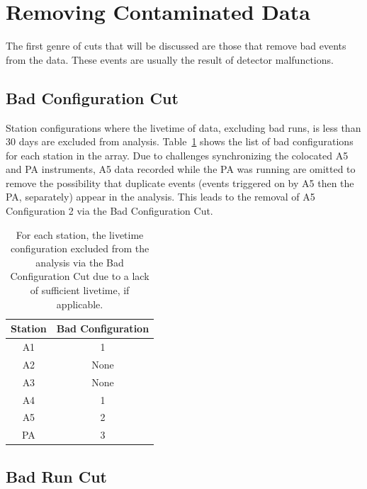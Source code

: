 \section{Removing Contaminated Data \label{sec:cleaning_glitches}}

  The first genre of cuts that will be discussed are those that remove bad events from the data. 
  These events are usually the result of detector malfunctions. 

  \subsection{Bad Configuration Cut}
  
    Station configurations where the livetime of data, excluding bad runs, is less than 30 days are excluded from analysis. 
    Table~\ref{tab:badconfigs} shows the list of bad configurations for each station in the array. 
    Due to challenges synchronizing the colocated A5 and PA instruments, A5 data recorded while the PA was running are omitted to remove the possibility that duplicate events (events triggered on by A5 then the PA, separately) appear in the analysis.
    This leads to the removal of A5 Configuration 2 via the Bad Configuration Cut. 
    
    \begin{table}
      \centering
      \begin{tabular}{| c | c |}
        \hline
        Station & Bad Configuration \\
        \hline
        A1 & 1 \\
        A2 & None \\
        A3 & None \\
        A4 & 1 \\
        A5 & 2 \\
        PA & 3 \\
        \hline
      \end{tabular}
      \caption{For each station, the livetime configuration excluded from the analysis via the Bad Configuration Cut due to a lack of sufficient livetime, if applicable.}
      \label{tab:badconfigs}
    \end{table}

  \subsection{Bad Run Cut \label{sec:brc}}

